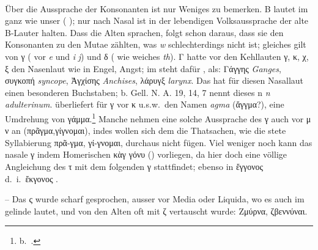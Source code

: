 \paragraph{\label{sec:ausprachekonsonanten}} Über die Aussprache der Konsonanten ist nur Weniges zu bemerken. B lautet im
 ganz wie unser  ( ); nur nach Nasal ist in der lebendigen
Volksaussprache der alte B-Lauter halten. Dass die Alten  sprachen, folgt schon
daraus, dass sie den Konsonanten zu den Mutae zählten, was \emph{w} schlechterdings
nicht ist; gleiches gilt von γ ( vor \emph{e} und \emph{i}
\emph{j}) und δ
( wie weiches
 \emph{th}).
Γ hatte vor den Kehllauten γ, κ, χ, ξ den Nasenlaut wie  in Engel,
Angst; im  steht dafür , als: Γάγγης
\emph{Ganges}, συγκοπή \emph{syncope}, Ἀγχίσης \emph{Anchises}, λάρυγξ
\emph{larynx}.
Das  hat für diesen Nasallaut einen
besonderen Buchstaben;  b. Gell. N. A. 19, 14, 7 nennt dieses n
\emph{n adulterinum}.
 überliefert für γ vor κ u.s.w.~den Namen \emph{agma}
(ἄγγμα?), eine Umdrehung von γάμμα.\footnote{%
	 b.\ .
}
Manche nehmen eine solche Aussprache des γ auch vor μ ν
an (πρᾶγμα,γίγνομαι), indes wollen sich dem die Thatsachen, wie die stete
Syllabierung πρᾶ-γμα, γί-γνομαι, durchaus nicht fügen.
Viel weniger noch kann das
nasale γ indem Homerischen κὰγ γόνυ () vorliegen, da hier doch eine
völlige Angleichung des τ mit dem folgenden γ stattfindet; ebenso in ἔγγονος
d.~i.\ ἔκγονος .

\noindent -- Das ς wurde scharf gesprochen, ausser vor Media oder
Liquida, wo es auch im  gelinde lautet, und von den Alten oft mit
ζ vertauscht wurde: Ζμύρνα, ζβεννύναι.

